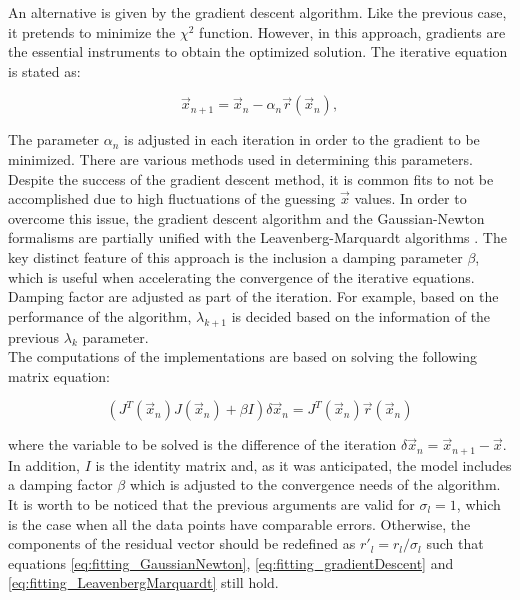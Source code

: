 \documentclass[openany]{book}
\begin{document}
An alternative is given by the gradient descent algorithm. Like the previous case, it pretends to minimize the $\chi^2$ function. However, in this approach, gradients are the essential instruments to obtain the optimized solution.  The iterative equation is stated as: 

\begin{equation}\label{eq:fitting_gradientDescent}
	\vec x_{n+1} = \vec x_{n} - \alpha_n \vec r(\vec x_n),
\end{equation}

The parameter $\alpha_n$ is adjusted in each iteration in order to the gradient to be minimized. There are various methods used in determining this parameters. \\

Despite the success of the gradient descent method, it is common fits to not be accomplished due to high fluctuations of the guessing $\vec x$ values. In order to overcome this issue, the gradient descent algorithm and the Gaussian-Newton formalisms are partially unified with the Leavenberg-Marquardt algorithms \cite{watson_more_1978}. The key distinct feature of this approach is the inclusion a damping parameter $\beta$, which is useful when accelerating the convergence of the iterative equations.  \\

Damping factor are adjusted as part of the iteration. For example, based on the performance of the algorithm, $\lambda_{k+1}$ is decided based on the information of the previous $\lambda_k$ parameter. \\

The computations of the implementations are based on solving the following matrix equation: 

\begin{equation}\label{eq:fitting_LeavenbergMarquardt}
	(J^{T}(\vec x_n) J(\vec x_n) + \beta I ) \delta \vec x_n = J^{T}(\vec x_n) \vec r(\vec x_n)
\end{equation}

where the variable to be solved is the difference of the iteration $\delta \vec x_n = \vec x_{n+1} - \vec x$. In addition, $I$ is the identity matrix and, as it was anticipated, the model includes a damping factor $\beta$ which is adjusted to the convergence needs of the algorithm. \\

It is worth to be noticed that the previous arguments are valid for $\sigma_l = 1$, which is the case when all the data points have comparable errors. Otherwise, the components of the residual vector should be redefined as $r'_l = r_l/\sigma_l$ such that equations \ref{eq:fitting_GaussianNewton}, \ref{eq:fitting_gradientDescent} and \ref{eq:fitting_LeavenbergMarquardt} still hold. \\
\end{document}
